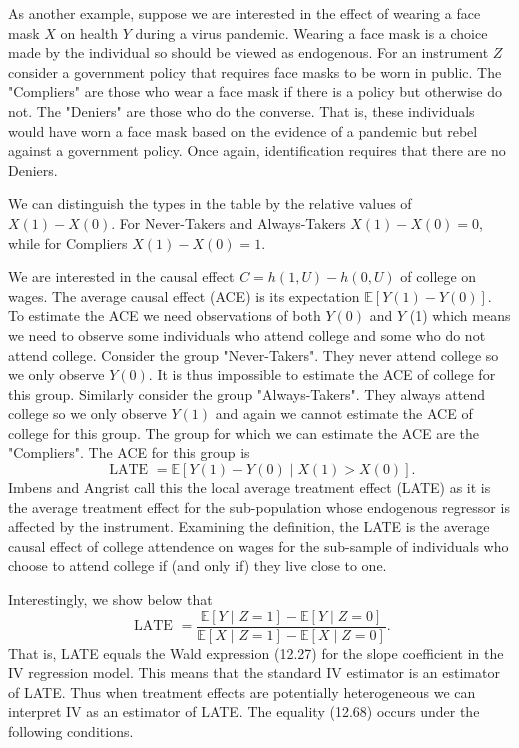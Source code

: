 \documentclass[10pt]{article}
\begin{document}
As another example, suppose we are interested in the effect of wearing a face mask $X$ on health $Y$ during a virus pandemic. Wearing a face mask is a choice made by the individual so should be viewed as endogenous. For an instrument $Z$ consider a government policy that requires face masks to be worn in public. The "Compliers" are those who wear a face mask if there is a policy but otherwise do not. The "Deniers" are those who do the converse. That is, these individuals would have worn a face mask based on the evidence of a pandemic but rebel against a government policy. Once again, identification requires that there are no Deniers.

We can distinguish the types in the table by the relative values of $X(1)-X(0)$. For Never-Takers and Always-Takers $X(1)-X(0)=0$, while for Compliers $X(1)-X(0)=1$.

We are interested in the causal effect $C=h(1, U)-h(0, U)$ of college on wages. The average causal effect (ACE) is its expectation $\mathbb{E}[Y(1)-Y(0)]$. To estimate the ACE we need observations of both $Y(0)$ and $Y$ (1) which means we need to observe some individuals who attend college and some who do not attend college. Consider the group "Never-Takers". They never attend college so we only observe $Y(0)$. It is thus impossible to estimate the ACE of college for this group. Similarly consider the group "Always-Takers". They always attend college so we only observe $Y(1)$ and again we cannot estimate the ACE of college for this group. The group for which we can estimate the ACE are the "Compliers". The ACE for this group is
$$
\text { LATE }=\mathbb{E}[Y(1)-Y(0) \mid X(1)>X(0)] .
$$
Imbens and Angrist call this the local average treatment effect (LATE) as it is the average treatment effect for the sub-population whose endogenous regressor is affected by the instrument. Examining the definition, the LATE is the average causal effect of college attendence on wages for the sub-sample of individuals who choose to attend college if (and only if) they live close to one.

Interestingly, we show below that
$$
\text { LATE }=\frac{\mathbb{E}[Y \mid Z=1]-\mathbb{E}[Y \mid Z=0]}{\mathbb{E}[X \mid Z=1]-\mathbb{E}[X \mid Z=0]} .
$$
That is, LATE equals the Wald expression (12.27) for the slope coefficient in the IV regression model. This means that the standard IV estimator is an estimator of LATE. Thus when treatment effects are potentially heterogeneous we can interpret IV as an estimator of LATE. The equality (12.68) occurs under the following conditions.
\end{document}
